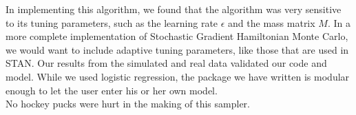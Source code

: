 In implementing this algorithm, we found that the algorithm was very sensitive to its tuning parameters, such as the learning rate $\epsilon$ and the mass matrix $M$. In a more complete implementation of Stochastic Gradient Hamiltonian Monte Carlo, we would want to include adaptive tuning parameters, like those that are used in STAN. Our results from the simulated and real data validated our code and model. While we used logistic regression, the package we have written is modular enough to let the user enter his or her own model.\\

No hockey pucks were hurt in the making of this sampler.